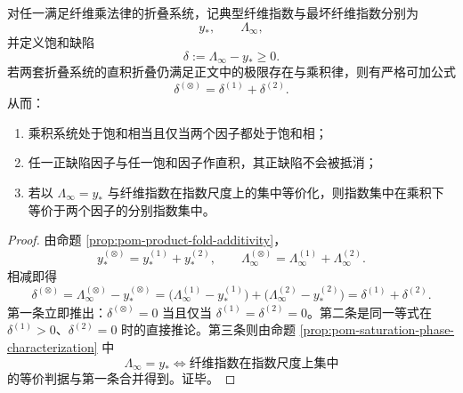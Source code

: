 \begin{theorem}[乘积折叠的饱和缺陷可加律]\label{thm:conclusion-product-fold-saturation-defect-additivity}
对任一满足纤维乘法律的折叠系统，记典型纤维指数与最坏纤维指数分别为
\[
y_\ast,
\qquad
\Lambda_\infty,
\]
并定义饱和缺陷
\[
\delta:=\Lambda_\infty-y_\ast\ge 0.
\]
若两套折叠系统的直积折叠仍满足正文中的极限存在与乘积律，则有严格可加公式
\[
\delta^{(\otimes)}=\delta^{(1)}+\delta^{(2)}.
\]
从而：
\begin{enumerate}
  \item 乘积系统处于饱和相当且仅当两个因子都处于饱和相；
  \item 任一正缺陷因子与任一饱和因子作直积，其正缺陷不会被抵消；
  \item 若以 \(\Lambda_\infty=y_\ast\) 与纤维指数在指数尺度上的集中等价化，则指数集中在乘积下等价于两个因子的分别指数集中。
\end{enumerate}
\end{theorem}

\begin{proof}
由命题 \ref{prop:pom-product-fold-additivity}，
\[
y_\ast^{(\otimes)}=y_\ast^{(1)}+y_\ast^{(2)},
\qquad
\Lambda_\infty^{(\otimes)}=\Lambda_\infty^{(1)}+\Lambda_\infty^{(2)}.
\]
相减即得
\[
\delta^{(\otimes)}
=
\Lambda_\infty^{(\otimes)}-y_\ast^{(\otimes)}
=
\bigl(\Lambda_\infty^{(1)}-y_\ast^{(1)}\bigr)
+\bigl(\Lambda_\infty^{(2)}-y_\ast^{(2)}\bigr)
=
\delta^{(1)}+\delta^{(2)}.
\]
第一条立即推出：\(\delta^{(\otimes)}=0\) 当且仅当 \(\delta^{(1)}=\delta^{(2)}=0\)。第二条是同一等式在 \(\delta^{(1)}>0\)、\(\delta^{(2)}=0\) 时的直接推论。第三条则由命题 \ref{prop:pom-saturation-phase-characterization} 中
\[
\Lambda_\infty=y_\ast
\iff
\text{纤维指数在指数尺度上集中}
\]
的等价判据与第一条合并得到。证毕。
\end{proof}



